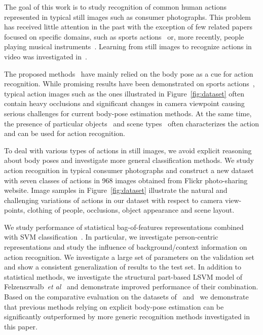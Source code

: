 \documentclass{bmvc2k}
\def\etal{\emph{et al}\bmvaOneDot}
\begin{document}
The goal of this work is to study recognition of common human actions represented in typical still images such as consumer photographs. This problem has received little attention in the past with the exception of few related
papers focused on specific domains, such as sports actions~\cite{Gupta09,Ikizler08,Li07,Wang06} or, more recently, people playing musical instruments~\cite{FeiFei10a}. Learning from still images to recognize actions in video was investigated in~\cite{Ikizler09}. 

The proposed methods~\cite{Gupta09,Ikizler08,Wang06} have mainly relied on the body pose as a cue for action recognition. While promising results have been demonstrated on sports actions~\cite{Gupta09,Ikizler08,Wang06}, typical action images such as the ones illustrated in Figure~\ref{fig:dataset} often contain heavy occlusions and significant changes in camera viewpoint causing serious challenges for current body-pose estimation methods. At the same time, the presence of particular objects~\cite{Gupta09} and scene types~\cite{Li07} often characterizes the action and can be used for action recognition.

To deal with various types of actions in still images, we avoid explicit reasoning about body poses and investigate more general classification methods. We study action recognition in typical consumer photographs and construct a new dataset with seven classes of actions in 968 images obtained from Flickr photo-sharing website. Image samples in Figure~\ref{fig:dataset} illustrate the natural and challenging variations of actions in our dataset with respect to camera view-points, clothing of people, occlusions, object appearance and scene layout.

We study performance of statistical bag-of-features representations combined with SVM classification~\cite{Zhang07}. In particular, we investigate person-centric representations and study the influence of background/context information on action recognition. We investigate a large set of parameters on the validation set and show a consistent generalization of results to the test set. In addition to statistical methods, we investigate the structural part-based  LSVM model of Felzenszwalb~\etal~\cite{Felzenszwalb09} and demonstrate improved performance of their combination. Based on the comparative evaluation on the datasets of~\cite{Gupta09} and~\cite{FeiFei10a} we demonstrate that previous methods relying on explicit body-pose estimation can be significantly outperformed by more generic recognition methods investigated in this paper.
\end{document}
